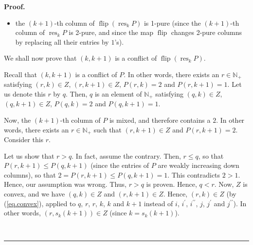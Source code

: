 \documentclass[numbers=enddot,12pt,final,onecolumn,notitlepage]{scrartcl}%
\theoremstyle{definition}
\newenvironment{proof}[1][Proof]{\noindent\textbf{#1.} }{\ \rule{0.5em}{0.5em}}
\newenvironment{verlong}{}{}
\begin{document}
\begin{verlong}
\begin{proof}
\begin{itemize}
\item the $\left(  k+1\right)  $-th column of $\operatorname*{flip}\left(
\operatorname*{res}\nolimits_{k}P\right)  $ is 1-pure (since the $\left(
k+1\right)  $-th column of $\operatorname*{res}\nolimits_{k}P$ is 2-pure, and
since the map $\operatorname*{flip}$ changes 2-pure columns by replacing all
their entries by $1$'s).
\end{itemize}

We shall now prove that $\left(  k,k+1\right)  $ is a conflict of
$\operatorname*{flip}\left(  \operatorname*{res}\nolimits_{k}P\right)  $.

Recall that $\left(  k,k+1\right)  $ is a conflict of $P$. In other words,
there exists an $r\in\mathbb{N}_{+}$ satisfying $\left(  r,k\right)  \in Z$,
$\left(  r,k+1\right)  \in Z$, $P\left(  r,k\right)  =2$ and $P\left(
r,k+1\right)  =1$. Let us denote this $r$ by $q$. Then, $q$ is an element of
$\mathbb{N}_{+}$ satisfying $\left(  q,k\right)  \in Z$, $\left(
q,k+1\right)  \in Z$, $P\left(  q,k\right)  =2$ and $P\left(  q,k+1\right)
=1$.

Now, the $\left(  k+1\right)  $-th column of $P$ is mixed, and therefore
contains a $2$. In other words, there exists an $r\in\mathbb{N}_{+}$ such that
$\left(  r,k+1\right)  \in Z$ and $P\left(  r,k+1\right)  =2$. Consider this
$r$.

Let us show that $r>q$. In fact, assume the contrary. Then, $r\leq q$, so that
$P\left(  r,k+1\right)  \leq P\left(  q,k+1\right)  $ (since the entries of
$P$ are weakly increasing down columns), so that $2=P\left(  r,k+1\right)
\leq P\left(  q,k+1\right)  =1$. This contradicts $2>1$. Hence, our assumption
was wrong. Thus, $r>q$ is proven. Hence, $q<r$. Now, $Z$ is convex, and we
have $\left(  q,k\right)  \in Z$ and $\left(  r,k+1\right)  \in Z$. Hence,
$\left(  r,k\right)  \in Z$ (by (\ref{eq.convex}), applied to $q$, $r$, $r$,
$k$, $k$ and $k+1$ instead of $i$, $i^{\prime}$, $i^{\prime\prime}$, $j$,
$j^{\prime}$ and $j^{\prime\prime}$). In other words, $\left(  r,s_{k}\left(
k+1\right)  \right)  \in Z$ (since $k=s_{k}\left(  k+1\right)  $).


\end{proof}
\end{verlong}
\end{document}
